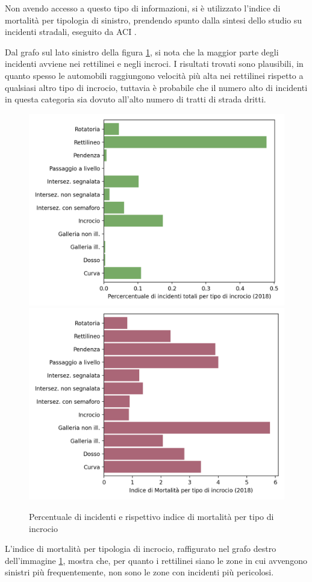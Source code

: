 \documentclass[a4paper]{report}
\begin{document}
Non avendo accesso a questo tipo di informazioni, si è utilizzato l'indice di mortalità per 
tipologia di sinistro, prendendo spunto dalla sintesi dello studio su incidenti stradali, 
eseguito da ACI \cite{ACI:2}.

Dal grafo sul lato sinistro della figura \ref{fig:tipo-intersezioni}, 
si nota che la maggior parte degli incidenti avviene nei rettilinei e negli incroci.
I risultati trovati sono plausibili, in quanto spesso le automobili raggiungono 
velocità più alta nei rettilinei rispetto a qualsiasi altro tipo di incrocio, tuttavia è probabile 
che il numero alto di incidenti in questa categoria sia dovuto all'alto numero di tratti di strada 
dritti.

\begin{figure}
    \includegraphics[width=0.5\linewidth]{../src/incidenti/incidenti_senza_coords/localizzazione_incidente/intersezioni.png}
    \includegraphics[width=0.5\linewidth]{../src/incidenti/incidenti_senza_coords/localizzazione_incidente/indice_mortalita.png}
    \caption{Percentuale di incidenti e rispettivo indice di mortalità per tipo di incrocio}
    \label{fig:tipo-intersezioni}
\end{figure}

L'indice di mortalità per tipologia di incrocio, raffigurato nel grafo destro 
dell'immagine \ref{fig:tipo-intersezioni}, mostra che, per quanto i rettilinei siano le zone 
in cui avvengono sinistri più frequentemente, non sono le zone con incidenti più pericolosi. 
\end{document}
